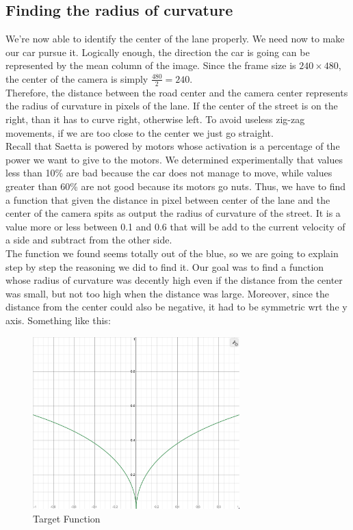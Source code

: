\documentclass[12pt,a4paper]{article}
\begin{document}
\begin{large}
\subsection{Finding the radius of curvature}
We're now able to identify the center of the lane properly. We need now to make our car pursue it. Logically enough, the direction the car is going can be represented by the mean column of the image. Since the frame size is $240 \times 480$, the center of the camera is simply $\frac{480}{2}=240$.\\
Therefore, the distance between the road center and the camera center represents the radius of curvature in pixels of the lane. If the center of the street is on the right, than it has to curve right, otherwise left. To avoid useless zig-zag movements, if we are too close to the center we just go straight. \\
Recall that Saetta is powered by motors whose activation is a percentage of the power we want to give to the motors. We determined experimentally that values less than 10\% are bad because the car does not manage to move, while values greater than 60\% are not good because its motors go nuts. 
Thus, we have to find a function that given the distance in pixel between center of the lane and the center of the camera spits as output the radius of curvature of the street. It is a value more or less between 0.1 and 0.6 that will be add to the current velocity of a side and subtract from the other side. \\
The function we found seems totally out of the blue, so we are going to explain step by step the reasoning we did to find it.
Our goal was to find a function whose radius of curvature was decently high even if the distance from the center was small, but not too high when the distance was large. Moreover, since the distance from the center could also be negative, it had to be symmetric wrt the y axis. Something like this:

\begin{figure} [h!]
  \centering
  \captionsetup{justification=centering}
  \includegraphics[width=8cm]{images/madFunction.png}
  \caption{Target Function}
  \end{figure}


\end{large}
\end{document}
